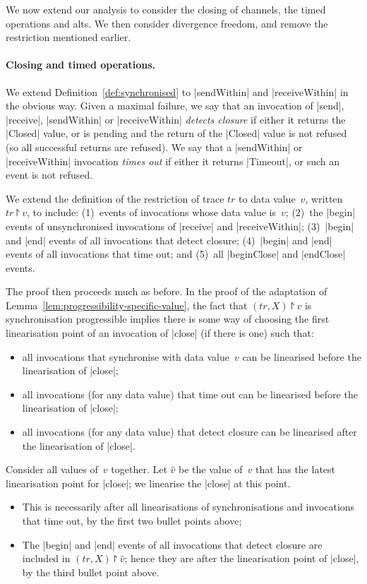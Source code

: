 We now extend our analysis to consider the closing of channels, the timed
operations and alts.  We then consider divergence freedom, and remove the
restriction mentioned earlier.


\paragraph{Closing and timed operations.}

We extend Definition~\ref{def:synchronised} to |sendWithin| and
|receiveWithin| in the obvious way.  Given a maximal failure, we say that an
invocation of |send|, |receive|, |sendWithin| or |receiveWithin| \emph{detects
  closure} if either it returns the |Closed| value, or is pending and the
return of the |Closed| value is not refused (so all successful returns are
refused).  We say that a |sendWithin| or |receiveWithin| invocation
\emph{times out} if either it returns |Timeout|, or such an event is not
refused.

We extend the definition of the restriction of trace $tr$ to data value~$v$,
written $tr \project v$, to include: (1)~events of invocations whose data
value is~$v$; (2)~the |begin| events of unsynchronised invocations of
|receive| and |receiveWithin|; (3)~|begin| and |end| events of all invocations
that detect closure; (4)~|begin| and |end| events of all invocations that
time out; and (5)~all |beginClose| and |endClose| events.

The proof then proceeds much as before.  In the proof of the adaptation of
Lemma~\ref{lem:progressibility-specific-value}, the fact that $(tr,X) \project
v$ is synchronisation progressible implies there is some way of choosing the
first linearisation point of an invocation of |close| (if there is one) such
that:
%
\begin{itemize}
\item all invocations that synchronise with data value~$v$ can be linearised
  before the linearisation of |close|;

\item all invocations (for any data value) that time out can be linearised
  before the linearisation of |close|;

\item all invocations (for any data value) that detect closure can be
  linearised after the linearisation of |close|.
\end{itemize}
%
Consider all values of~$v$ together.  Let $\hat{v}$ be the value of~$v$ that
has the latest linearisation point for |close|; we linearise the |close| at
this point.
%
\begin{itemize}
\item This is necessarily after all linearisations of synchronisations and
  invocations that time out, by the first two bullet points above;

\item The |begin| and |end| events of all invocations that detect closure are
  included in $(tr,X) \project \hat{v}$; hence they are after the 
  linearisation point of |close|, by the third bullet point above.
\end{itemize}

